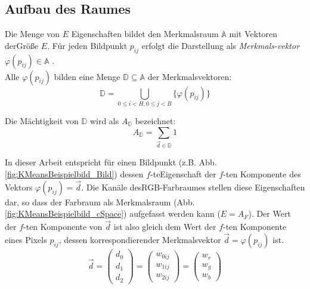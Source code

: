 \subsection{Aufbau des Raumes}
  Die Menge von $E$ Eigenschaften bildet den Merkmalsraum $\mathbb{A}$ mit Vektoren der\linebreak Größe $E$. Für jeden Bildpunkt $p_{ij}$ erfolgt die Darstellung als \textit{Merkmals-\linebreak vektor} $\varphi(p_{ij})\in\mathbb{A}$ \cite{Jaehne2002}.\\

  \noindent Alle $\varphi(p_{ij})$ bilden eine Menge $\mathbb{D}\subseteq\mathbb{A}$ der Merkmalsvektoren:
  \begin{equation}\label{DefMerkmalsmenge}
    \mathbb{D} = \bigcup\limits_{0\leq i < H, 0\leq j < B} \{\varphi(p_{ij})\}
  \end{equation}
 
  \noindent Die Mächtigkeit von $\mathbb{D}$ wird als $A_\mathbb{D}$ bezeichnet:
  \begin{equation}\label{DefMerkmalsmenge}
    A_\mathbb{D}  = \sum\limits_{\vec{d}\in\mathbb{D}} 1
  \end{equation}

  \noindent In dieser Arbeit entspricht für einen Bildpunkt (z.B. Abb. \ref{fig:KMeansBeispielbild_Bild}) dessen $f$-te\linebreak Eigenschaft der $f$-ten Komponente des Vektors $\varphi(p_{ij})= \vec{d}$.
  Die Kanäle des\linebreak RGB-Farbraumes stellen diese Eigenschaften dar, so dass der Farbraum als Merkmalsraum (Abb. \ref{fig:KMeansBeispielbild_cSpace}) aufgefasst werden kann ($E=A_F$). Der Wert der $f$-ten Komponente von $\vec{d}$ ist also gleich dem Wert der $f$-ten Komponente eines Pixels $p_{ij}$, dessen korrespondierender Merkmalsvektor $\vec{d}=\varphi(p_{ij})$ ist.
  \begin{equation}
    \vec{d} = \left(\begin{array}{l} d_0\\ d_1\\ d_2\end{array}\right) = \left(\begin{array}{l} w_{0ij}\\ w_{1ij}\\ w_{2ij}\end{array}\right) = \left(\begin{array}{l} w_r\\ w_g\\ w_b\end{array}\right)
  \end{equation}

